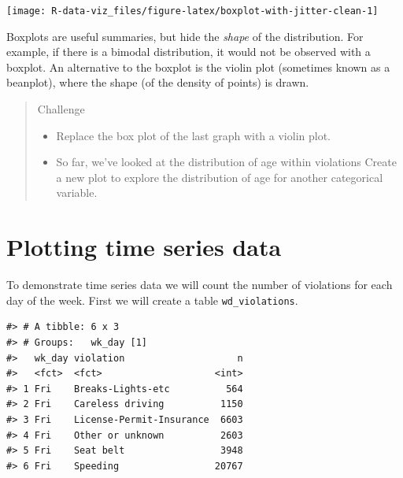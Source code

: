 \documentclass[]{book}
\newenvironment{Shaded}{\begin{snugshade}}{\end{snugshade}}
\newcommand{\KeywordTok}[1]{\textcolor[rgb]{0.13,0.29,0.53}{\textbf{#1}}}
\newcommand{\StringTok}[1]{\textcolor[rgb]{0.31,0.60,0.02}{#1}}
\newcommand{\CommentTok}[1]{\textcolor[rgb]{0.56,0.35,0.01}{\textit{#1}}}
\newcommand{\OperatorTok}[1]{\textcolor[rgb]{0.81,0.36,0.00}{\textbf{#1}}}
\newcommand{\NormalTok}[1]{#1}
\theoremstyle{definition}
\theoremstyle{definition}
\theoremstyle{definition}
\theoremstyle{remark}
\begin{document}
\texttt{[image: R-data-viz\_files/figure-latex/boxplot-with-jitter-clean-1]}

Boxplots are useful summaries, but hide the \emph{shape} of the
distribution. For example, if there is a bimodal distribution, it would
not be observed with a boxplot. An alternative to the boxplot is the
violin plot (sometimes known as a beanplot), where the shape (of the
density of points) is drawn.

\begin{quote}
Challenge

\begin{itemize}
\item
  Replace the box plot of the last graph with a violin plot.
\item
  So far, we've looked at the distribution of age within violations
  Create a new plot to explore the distribution of age for another
  categorical variable.
\end{itemize}
\end{quote}

\section{Plotting time series data}\label{plotting-time-series-data}

To demonstrate time series data we will count the number of violations
for each day of the week. First we will create a table
\texttt{wd\_violations}.

\begin{Shaded}
\end{Shaded}

\begin{verbatim}
#> # A tibble: 6 x 3
#> # Groups:   wk_day [1]
#>   wk_day violation                    n
#>   <fct>  <fct>                    <int>
#> 1 Fri    Breaks-Lights-etc          564
#> 2 Fri    Careless driving          1150
#> 3 Fri    License-Permit-Insurance  6603
#> 4 Fri    Other or unknown          2603
#> 5 Fri    Seat belt                 3948
#> 6 Fri    Speeding                 20767
\end{verbatim}
\end{document}
